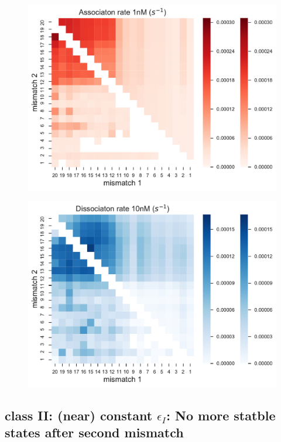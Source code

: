 \documentclass[a4paper,twoside]{revtex4-1}
\begin{document}
\begin{figure}[H]
\includegraphics[scale=0.5]{fig29_10_10_2018.pdf}
\end{figure}

\begin{figure}[H]
\includegraphics[scale=0.5]{fig30_10_10_2018.pdf}
\end{figure}


\subsection{class II: (near) constant $\epsilon_I$: No more statble states after second mismatch}
\end{document}
